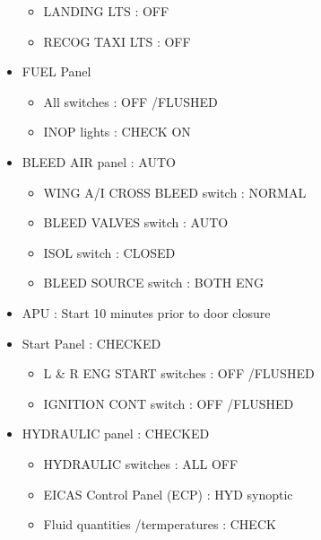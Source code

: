 \begin{itemize}
\begin{itemize}
\item LANDING LTS : OFF

\item RECOG TAXI LTS : OFF

\end{itemize}

\item FUEL Panel

\begin{itemize}
\item All switches : OFF \slash  FLUSHED

\item INOP lights : CHECK ON

\end{itemize}

\item BLEED AIR panel : AUTO

\begin{itemize}
\item WING A\slash I CROSS BLEED switch : NORMAL

\item BLEED VALVES switch : AUTO

\item ISOL switch : CLOSED

\item BLEED SOURCE switch : BOTH ENG

\end{itemize}

\item APU : Start 10 minutes prior to door closure

\item Start Panel : CHECKED

\begin{itemize}
\item L \& R ENG START switches : OFF \slash  FLUSHED

\item IGNITION CONT switch : OFF \slash  FLUSHED
\newpage

\end{itemize}

\item HYDRAULIC panel : CHECKED

\begin{itemize}
\item HYDRAULIC switches : ALL OFF

\item EICAS Control Panel (ECP) : HYD synoptic

\item Fluid quantities \slash  termperatures : CHECK


\end{itemize}
\end{itemize}
